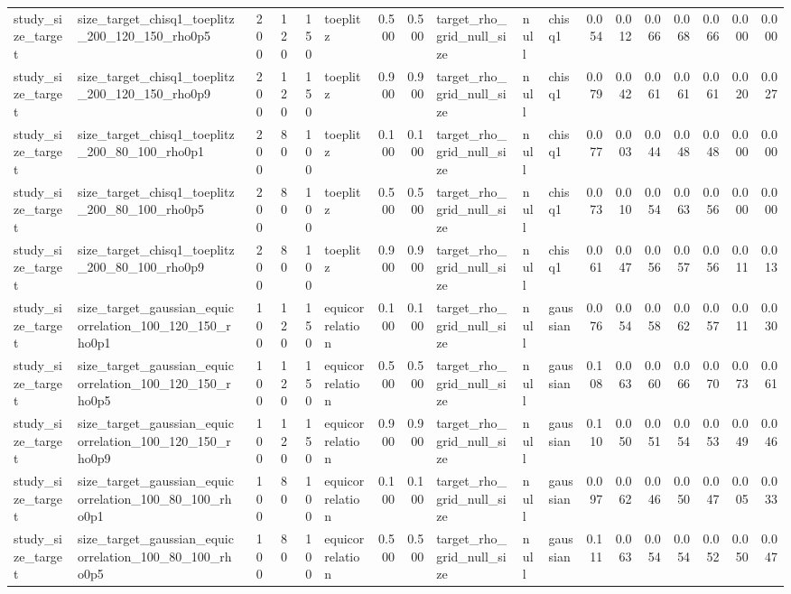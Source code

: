 \begin{tabular}{llrrrlrrlllrrrrrrr}
study\_size\_target & size\_target\_chisq1\_toeplitz\_200\_120\_150\_rho0p5 & 200 & 120 & 150 & toeplitz & 0.500 & 0.500 & target\_rho\_grid\_null\_size & null & chisq1 & 0.054 & 0.012 & 0.066 & 0.068 & 0.066 & 0.000 & 0.000 \\
study\_size\_target & size\_target\_chisq1\_toeplitz\_200\_120\_150\_rho0p9 & 200 & 120 & 150 & toeplitz & 0.900 & 0.900 & target\_rho\_grid\_null\_size & null & chisq1 & 0.079 & 0.042 & 0.061 & 0.061 & 0.061 & 0.020 & 0.027 \\
study\_size\_target & size\_target\_chisq1\_toeplitz\_200\_80\_100\_rho0p1 & 200 & 80 & 100 & toeplitz & 0.100 & 0.100 & target\_rho\_grid\_null\_size & null & chisq1 & 0.077 & 0.003 & 0.044 & 0.048 & 0.048 & 0.000 & 0.000 \\
study\_size\_target & size\_target\_chisq1\_toeplitz\_200\_80\_100\_rho0p5 & 200 & 80 & 100 & toeplitz & 0.500 & 0.500 & target\_rho\_grid\_null\_size & null & chisq1 & 0.073 & 0.010 & 0.054 & 0.063 & 0.056 & 0.000 & 0.000 \\
study\_size\_target & size\_target\_chisq1\_toeplitz\_200\_80\_100\_rho0p9 & 200 & 80 & 100 & toeplitz & 0.900 & 0.900 & target\_rho\_grid\_null\_size & null & chisq1 & 0.061 & 0.047 & 0.056 & 0.057 & 0.056 & 0.011 & 0.013 \\
study\_size\_target & size\_target\_gaussian\_equicorrelation\_100\_120\_150\_rho0p1 & 100 & 120 & 150 & equicorrelation & 0.100 & 0.100 & target\_rho\_grid\_null\_size & null & gaussian & 0.076 & 0.054 & 0.058 & 0.062 & 0.057 & 0.011 & 0.030 \\
study\_size\_target & size\_target\_gaussian\_equicorrelation\_100\_120\_150\_rho0p5 & 100 & 120 & 150 & equicorrelation & 0.500 & 0.500 & target\_rho\_grid\_null\_size & null & gaussian & 0.108 & 0.063 & 0.060 & 0.066 & 0.070 & 0.073 & 0.061 \\
study\_size\_target & size\_target\_gaussian\_equicorrelation\_100\_120\_150\_rho0p9 & 100 & 120 & 150 & equicorrelation & 0.900 & 0.900 & target\_rho\_grid\_null\_size & null & gaussian & 0.110 & 0.050 & 0.051 & 0.054 & 0.053 & 0.049 & 0.046 \\
study\_size\_target & size\_target\_gaussian\_equicorrelation\_100\_80\_100\_rho0p1 & 100 & 80 & 100 & equicorrelation & 0.100 & 0.100 & target\_rho\_grid\_null\_size & null & gaussian & 0.097 & 0.062 & 0.046 & 0.050 & 0.047 & 0.005 & 0.033 \\
study\_size\_target & size\_target\_gaussian\_equicorrelation\_100\_80\_100\_rho0p5 & 100 & 80 & 100 & equicorrelation & 0.500 & 0.500 & target\_rho\_grid\_null\_size & null & gaussian & 0.111 & 0.063 & 0.054 & 0.054 & 0.052 & 0.050 & 0.047 \\

\end{tabular}
